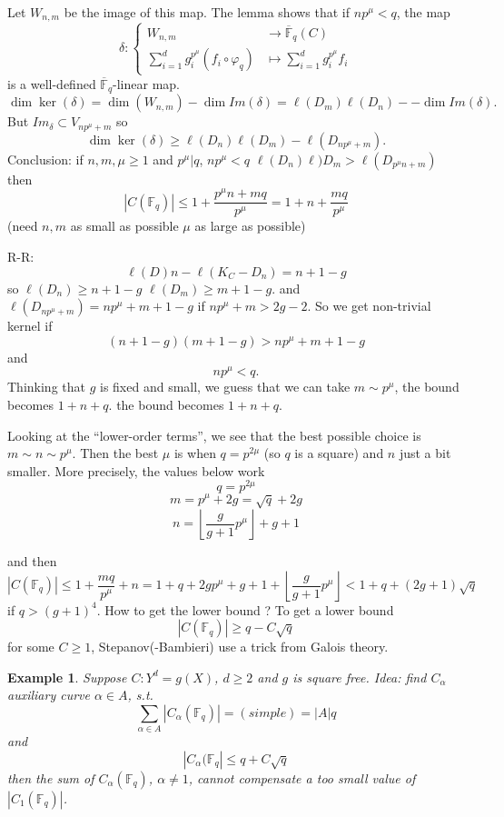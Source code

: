 \documentclass[11pt]{article}
\newtheorem{ex}[thm]{Example}
\newcommand{\bbf}{\mathbb F}
\newcommand{\lrta}{\longrightarrow}
\begin{document}
Let $W_{n,m}$ be the image  of this map. The lemma shows that if $n p^\mu<q$, the map 
$$
\delta:\left\{
\begin{aligned}
W_{n,m}&\lrta \overline{\bbf}_q(C)\\
\sum_{i=1}^d
g_i^{p^\mu}(f_i\circ \varphi_q)&
\longmapsto \sum_{i=1}^d g_i^{p^\mu}f_i
\end{aligned}\right.
$$
is a well-defined $\overline{\bbf}_q$-linear map. 
$$
\dim \ker(\delta)=\dim(W_{n,m})-\dim Im(\delta)=\ell(D_m)\ell(D_n)--\dim Im(\delta).
$$
But $Im_{\delta}\subset V_{np^\mu+m}$ so 
$$
\dim \ker(\delta)\geq \ell(D_n)\ell(D_m)-\ell(D_{np^\mu+m}).
$$
Conclusion:
if $n,m,\mu\geq 1$ and 
$p^\mu|q$, $np^\mu<q$ $\ell(D_n)\ell)D_m> \ell(D_{p^\mu n+m})$ then 
$$
|C(\bbf_q)|\leq 1+\frac{p^\mu n+ m q}{p^{\mu}}=1+n+\frac{mq}{p^\mu}
$$
(need $n,m$ as small as possible $\mu$ as large as possible)

R-R:
$$
\ell(D)n
-\ell(K_C-D_n)=n+1-g
$$
so $\ell(D_n)\geq n+1 -g$ $\ell(D_m)\geq m+1 -g$. and $\ell(D_{n p^\mu +m})=np^\mu+m+1-g$ if $np^\mu +m> 2g-2$. So we  get  non-trivial kernel if 
$$
(n+1-g)(m+1-g)> np^\mu+m+1-g
$$
and 
$$
np^\mu < q.
$$
Thinking that $g$ is fixed and small, we guess that we can take $m\sim p^\mu$, the bound becomes $1+n+q$. the bound becomes $1+n+q$. 

Looking at the ``lower-order terms'', we see that the best possible choice is $m\sim n\sim p^\mu$. Then the best $\mu$ is when  $q=p^{2\mu}$ (so $q$ is a square) and $n$ just  a bit smaller. More precisely, the values below work
$$
q=p^{2\mu}
$$
$$
m=p^\mu+2g=\sqrt{q}+2g
$$
$$
n=\left\lfloor \frac{g}{g+1}p^\mu\right\rfloor +g+1
$$

and then
$$
|C(\bbf_q)|\leq 1+\frac{m q}{p^\mu}+n =1+q+2g p^\mu +g+1+ \left\lfloor \frac{g}{g+1}p^\mu\right\rfloor< 1+q+(2g+1)\sqrt{q}
$$
if $q > (g+1)^4$.  How to get the lower bound ? To get a lower bound 
$$
|C(\bbf_q)|\geq q- C\sqrt{q}
$$
for some $C\geq 1$, Stepanov(-Bambieri) use a trick from Galois theory.

\begin{ex}
Suppose $C:Y^d=g(X)$, $d\geq 2$ and $g$  is square free. 
Idea: find $C_\alpha$ auxiliary curve $\alpha\in A$, s.t. 
$$
\sum_{\alpha\in A}|C_\alpha(\bbf_q)|=(simple)=|A|q
$$
and 
$$
|C_\alpha(\bbf_q|\leq q+ C\sqrt{q}
$$
then the sum of $C_\alpha(\bbf_q)$, $\alpha\neq 1$, cannot compensate a too small value of $|C_1(\bbf_q)|$.
\end{ex}
\end{document}

